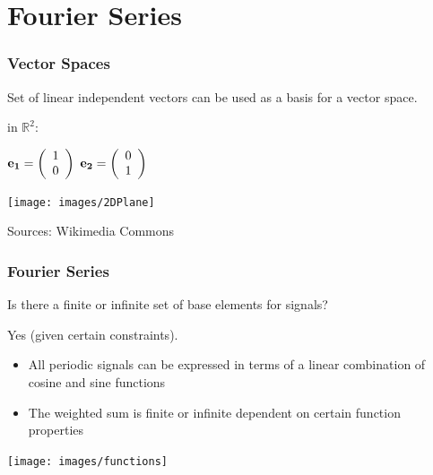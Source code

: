 
\subtitle{Fourier Series}
\frame[plain,c]{\titlepage}

\section{Fourier Series}%
\label{sec:fourier_series}



\begin{frame}
    \frametitle{Vector Spaces}

    Set of linear independent vectors can be used as a basis for a vector space.\newline

    \myExample in $\mathbb{R}^2$:

    \begin{center}

        $\bf{e}_1= \left( \begin{array}{cc} 1 \\ 0 \end{array} \right)$
        \hspace{10 mm}
        $\bf{e}_2= \left( \begin{array}{cc} 0 \\ 1 \end{array} \right)$\newline

        \texttt{[image: images/2DPlane]}

        \begin{flushright}
            \scriptsize Sources: Wikimedia Commons
        \end{flushright}
    \end{center}\end{frame}



\begin{frame}
    \frametitle{Fourier Series}

    \question Is there a finite or infinite set of base elements for signals?

    \answer Yes (given certain constraints).\newline

    \begin{itemize}
        \item All periodic signals can be expressed in terms of a linear combination of cosine and sine functions
        \item The weighted sum is finite or infinite dependent on certain function properties
    \end{itemize}

    \begin{center}
        \texttt{[image: images/functions]}
    \end{center}
\end{frame}


